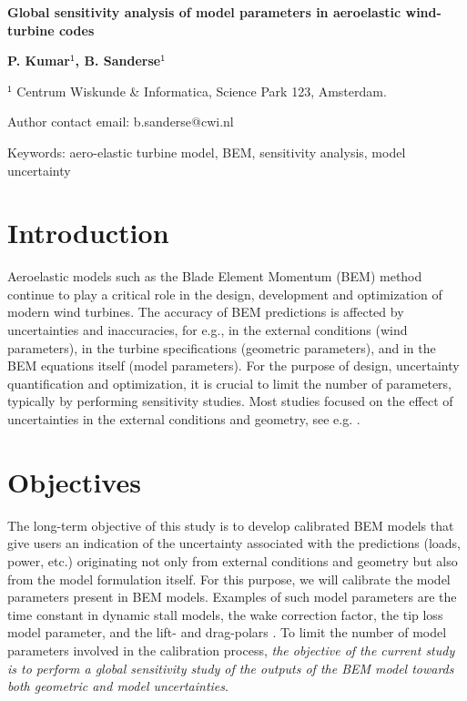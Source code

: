 \documentclass[11pt]{article}
\begin{document}
\raggedright %

\vspace*{80pt}
{\LARGE \textbf{Global sensitivity analysis of model parameters in aeroelastic wind-turbine codes}}
\vspace*{28pt}

\begin{addmargin}[2.5cm]{0em}%
\textbf{P. Kumar$^{\boldsymbol{\mathsf{1}}}$, B. Sanderse$^{\boldsymbol{\mathsf{1}}}$}

$^{\mathsf{1}}$ Centrum Wiskunde \& Informatica, Science Park 123, Amsterdam.


Author contact email: b.sanderse@cwi.nl

Keywords: aero-elastic turbine model, BEM, sensitivity analysis, model uncertainty
\end{addmargin}

\section{Introduction}
Aeroelastic models such as the Blade Element Momentum (BEM) method \cite{HandBook} continue to play a critical role in the design, development and optimization of modern wind turbines. The accuracy of BEM predictions is affected by uncertainties and inaccuracies, for e.g., in the external conditions (wind parameters), in the turbine specifications (geometric parameters), and in the BEM equations itself (model parameters). For the purpose of design, uncertainty quantification and optimization, it is crucial to limit the number of parameters, typically by performing sensitivity studies. Most studies focused on the effect of uncertainties in the external conditions and geometry, see e.g. \cite{Echeverria2017,Robertson2018}. %
\section{Objectives}
The long-term objective of this study is to develop calibrated BEM models that give users an indication of the uncertainty associated with the predictions (loads, power, etc.) originating not only from external conditions and geometry but also from the model formulation itself. For this purpose, we will calibrate the model parameters present in BEM models. Examples of such model parameters are the time constant in dynamic stall models, the wake correction factor, the tip loss model parameter, and the lift- and drag-polars \cite{Sayed2019}. To limit the number of model parameters involved in the calibration process, \textit{the objective of the current study is to perform a global sensitivity study of the outputs of the BEM model towards both geometric and model uncertainties}.
\end{document}
